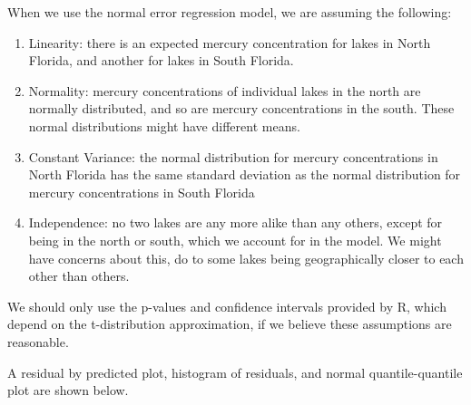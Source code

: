 \documentclass[
  letterpaper,
  DIV=11,
  numbers=noendperiod]{scrreprt}
\begin{document}
When we use the normal error regression model, we are assuming the
following:

\begin{enumerate}
\def\labelenumi{\arabic{enumi}.}
\item
  Linearity: there is an expected mercury concentration for lakes in
  North Florida, and another for lakes in South Florida.
\item
  Normality: mercury concentrations of individual lakes in the north are
  normally distributed, and so are mercury concentrations in the south.
  These normal distributions might have different means.
\item
  Constant Variance: the normal distribution for mercury concentrations
  in North Florida has the same standard deviation as the normal
  distribution for mercury concentrations in South Florida
\item
  Independence: no two lakes are any more alike than any others, except
  for being in the north or south, which we account for in the model. We
  might have concerns about this, do to some lakes being geographically
  closer to each other than others.
\end{enumerate}

We should only use the p-values and confidence intervals provided by R,
which depend on the t-distribution approximation, if we believe these
assumptions are reasonable.

A residual by predicted plot, histogram of residuals, and normal
quantile-quantile plot are shown below.
\end{document}

